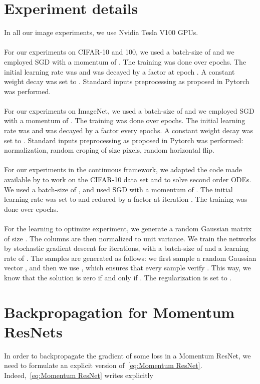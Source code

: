 \documentclass{article}
\begin{document}
\section{Experiment details}\label{app:experiment_details}

In all our image experiments, we use Nvidia Tesla V100 GPUs.
\\
\\
For our experiments on CIFAR-10 and 100, we used a batch-size of  and we employed SGD with a momentum of . The training was done over  epochs. The initial learning rate was  and was decayed by a factor  at epoch . A constant weight decay was set to . Standard inputs preprocessing as proposed in Pytorch \citep{paszke2017automatic} was performed.  
\\
\\
For our experiments on ImageNet, we used a batch-size of  and we employed SGD with a momentum of . The training was done over  epochs. The initial learning rate was  and was decayed by a factor  every  epochs. A constant weight decay was set to . Standard inputs preprocessing as proposed in Pytorch \citep{paszke2017automatic} was performed: normalization, random croping of size  pixels, random horizontal flip. 
\\
\\
For our experiments in the continuous framework, we adapted the code made available by \citet{chen2018neural} to work on the CIFAR-10 data set and to solve second order ODEs. We used a batch-size of , and used SGD with a momentum of . The initial learning rate was set to  and reduced by a factor  at iteration . The training was done over  epochs. 
\\
\\
For the learning to optimize experiment, we generate a random Gaussian matrix  of size . The columns are then normalized to unit variance.
We train the networks by stochastic gradient descent for  iterations, with a batch-size of  and a learning rate of .
The samples  are generated as follows:
we first sample a random Gaussian vector , and then we use , which ensures that every sample verify . This way, we know that the solution  is zero if and only if . The regularization is set to .
\section{Backpropagation for Momentum ResNets}\label{app:backprop_mom_nets}

In order to backpropagate the gradient of some loss in a Momentum ResNet, we need to formulate an explicit version of~\eqref{eq:Momentum ResNet}.
Indeed,~\eqref{eq:Momentum ResNet} writes explicitly 
\end{document}
